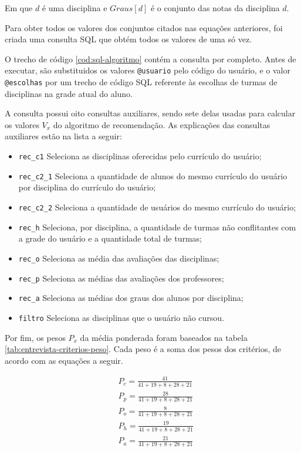 Em que $d$ é uma disciplina e $Graus[d]$ é o conjunto das notas da disciplina $d$.

Para obter todos os valores dos conjuntos citados nas equações anteriores, foi criada uma consulta SQL que obtém todos os valores de uma só vez. 

O trecho de código \ref{cod:sql-algoritmo} contém a consulta por completo. Antes de executar, são substituidos os valores \verb|@usuario| pelo código do usuário, e o valor \verb|@escolhas| por um trecho de código SQL referente às escolhas de turmas de disciplinas na grade atual do aluno.



A consulta possui oito consultas auxiliares, sendo sete delas usadas para calcular os valores $V_x$ do algoritmo de recomendação. As explicações das consultas auxiliares estão na lista a seguir:

\begin{itemize}
    \item \verb|rec_c1| Seleciona as disciplinas oferecidas pelo currículo do usuário;
    \item \verb|rec_c2_1| Seleciona a quantidade de alunos do mesmo currículo do usuário por disciplina do currículo do usuário;
    \item \verb|rec_c2_2| Seleciona a quantidade de usuários do mesmo currículo do usuário;
    \item \verb|rec_h| Seleciona, por disciplina, a quantidade de turmas não conflitantes com a grade do usuário e a quantidade total de turmas;
    \item \verb|rec_o| Seleciona as média das avaliações das disciplinas;
    \item \verb|rec_p| Seleciona as médias das avaliações dos professores;
    \item \verb|rec_a| Seleciona as médias dos graus dos alunos por disciplina;
    \item \verb|filtro| Seleciona as disciplinas que o usuário não cursou. 
\end{itemize}

Por fim, os pesos $P_x$ da média ponderada foram baseados na tabela \ref{tab:entrevista-criterios-peso}. Cada peso é a soma dos pesos dos critérios, de acordo com as equações a seguir.

\begin{align}
    & P_c = \frac{41}{41 + 19 + 8 + 28 + 21} \\[10pt]
    & P_p = \frac{28}{41 + 19 + 8 + 28 + 21} \\[10pt]
    & P_o = \frac{ 8}{41 + 19 + 8 + 28 + 21} \\[10pt]
    & P_h = \frac{19}{41 + 19 + 8 + 28 + 21} \\[10pt]
    & P_a = \frac{21}{41 + 19 + 8 + 28 + 21}
\end{align}

